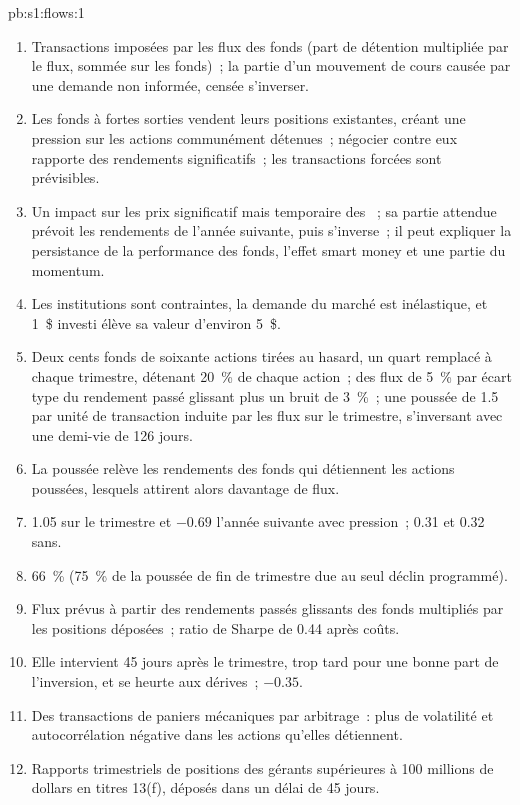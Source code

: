 \begin{solution}{pb:s1:flows:1}
\begin{enumerate}
\item Transactions imposées par les flux des fonds (part de détention multipliée par le flux, sommée sur les fonds)~; la partie d'un mouvement de cours causée par une demande non informée, censée s'inverser.
\item Les fonds à fortes sorties vendent leurs positions existantes, créant une pression sur les actions communément détenues~; négocier contre eux rapporte des rendements significatifs~; les
transactions forcées sont prévisibles.
\item Un impact sur les prix significatif mais temporaire des ~; sa partie attendue prévoit les rendements de l'année suivante, puis s'inverse~; il peut expliquer la
persistance de la performance des fonds, l'effet smart money et une partie du momentum.
\item Les institutions sont contraintes, la demande du marché est inélastique, et 1~\$ investi élève sa valeur d'environ 5~\$.
\item Deux cents fonds de soixante actions tirées au hasard, un quart remplacé à chaque trimestre, détenant 20~\% de chaque action~; des flux de 5~\% par écart type du rendement
passé glissant plus un bruit de 3~\%~; une poussée de 1.5 par unité de transaction induite par les flux sur le trimestre, s'inversant avec une demi-vie de 126 jours.
\item La poussée relève les rendements des fonds qui détiennent les actions poussées, lesquels attirent alors davantage de flux.
\item 1.05 sur le trimestre et $-0.69$ l'année suivante avec pression~; 0.31 et 0.32 sans.
\item 66~\% (75~\% de la poussée de fin de trimestre due au seul déclin programmé).
\item Flux prévus à partir des rendements passés glissants des fonds multipliés par les positions déposées~; ratio de Sharpe de 0.44 après coûts.
\item Elle intervient 45 jours après le trimestre, trop tard pour une bonne part de l'inversion, et se heurte aux dérives~; $-0.35$.
\item Des transactions de paniers mécaniques par arbitrage~: plus de volatilité et autocorrélation négative dans les actions qu'elles détiennent.
\item Rapports trimestriels de positions des gérants supérieures à 100 millions de dollars en titres 13(f), déposés dans un délai de 45 jours.

\end{enumerate}
\end{solution}
